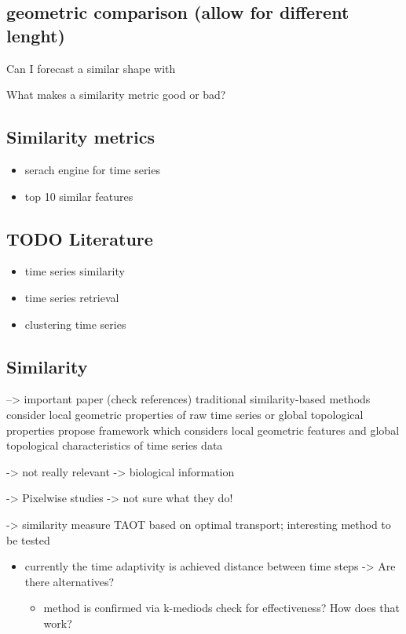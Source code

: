 \documentclass[11pt]{article}
\begin{document}
\subsection{geometric comparison (allow for different lenght)}
\label{sec:org44d1dcd}
Can I forecast a similar shape with

What makes a similarity metric good or bad?
\subsection{Similarity metrics}
\label{sec:orgf028a26}
\begin{itemize}
\item serach engine for time series
\item top 10 similar features
\end{itemize}

\subsection{{\bfseries\sffamily TODO} Literature}
\label{sec:orgbf003b4}
\begin{itemize}
\item time series similarity
\item time series retrieval
\item clustering time series
\end{itemize}

\subsection{Similarity}
\label{sec:org35cffad}
\cite{Zhang_2021} --> important paper (check references)
traditional similarity-based methods consider local geometric properties of raw time series or global topological properties
propose framework which considers local geometric features and global topological characteristics of time series data

\cite{Cleasby_2019} -> not really relevant -> biological information


\cite{Santos_2019} -> Pixelwise studies -> not sure what they do!

\cite{Zhang_2020} -> similarity measure TAOT based on optimal transport; interesting method to be tested
\begin{itemize}
\item currently the time adaptivity is achieved distance between time steps -> Are there alternatives?
\begin{itemize}
\item method is confirmed via k-mediods check for effectiveness? How does that work?
\end{itemize}
\end{itemize}
\end{document}
